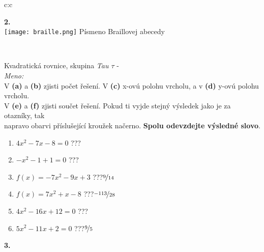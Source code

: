\documentclass[10pt]{report}
\begin{document}
\begin{tabular}{c:c}
\begin{minipage}[c][99mm][t]{0.49\linewidth}
\begin{center}
\begin{minipage}{0.20\linewidth}
\begin{center}
{\Huge\bfseries 2.} \\[2mm]
\texttt{[image: braille.png]}
{\small Písmeno Braillovej abecedy}
\end{center}
\end{minipage}
\end{center}
\end{minipage}
\\ \hdashline
\begin{minipage}[c][99mm][t]{0.49\linewidth}
\begin{center}
\vspace{7mm}
{\huge Kvadratická rovnice, skupina \textit{Tau $\tau$} -}\\[4.5mm]
\textit{Meno:}\phantom{xxxxxxxxxxxxxxxxxxxxxxxxxxxxxxxxxxxxxxxxxxxxxxxxxxxxxxxxxxxxxxxxx}\\[3.5mm]
V \textbf{(a)} a \textbf{(b)} zjisti počet řešení. V \textbf{(c)} x-ovú polohu vrcholu, a v \textbf{(d)} y-ovú polohu vrcholu.\\V \textbf{(e)} a \textbf{(f)} zjisti součet řešení. Pokud ti vyjde stejný výsledek jako je za otazníky, tak\\napravo obarvi příslušející kroužek načerno. \textbf{Spolu odevzdejte výsledné slovo}.\\[3mm]
\begin{minipage}{0.77\linewidth}
\begin{center}
\begin{varwidth}{\textwidth}
\begin{enumerate}
\large
\item $4x^2-7x-8=0$\quad \dotfill\; ???\;\dotfill {}
\item $-x^2-1+1=0$\quad \dotfill\; ???\;\dotfill {}
\item $f(x)=-7x^2-9x+3$\quad \dotfill\; ???\;\dotfill \quad $\nicefrac{9}{14}$
\item $f(x)=7x^2+x-8$\quad \dotfill\; ???\;\dotfill \quad $\nicefrac{-113}{28}$
\item $4x^2-16x+12=0$\quad \dotfill\; ???\;\dotfill {}
\item $5x^2-11x+2=0$\quad \dotfill\; ???\;\dotfill \quad $\nicefrac{9}{5}$
\end{enumerate}
\end{varwidth}
\end{center}
\end{minipage}
\begin{minipage}{0.20\linewidth}
\begin{center}
{\Huge\bfseries 3.} \\[2mm]

\end{center}
\end{minipage}
\end{center}
\end{minipage}
\end{tabular}
\end{document}
